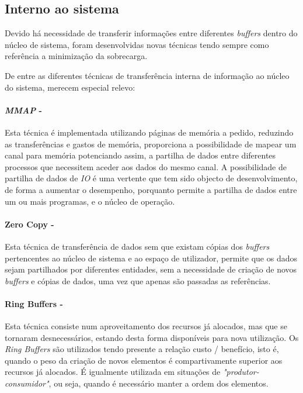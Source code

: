 \subsection{Interno ao sistema}

Devido há necessidade de transferir informações entre diferentes \textit{buffers} dentro do núcleo de sistema, foram desenvolvidas novas técnicas tendo sempre como referência a minimização da sobrecarga.

De entre as diferentes técnicas de transferência interna de informação ao núcleo do sistema, merecem especial relevo:

\paragraph*{\textit{MMAP} - }

Esta técnica é implementada utilizando páginas de memória a pedido, reduzindo as transferências e gastos de memória, proporciona a possibilidade de mapear um canal para memória potenciando assim, a partilha de dados entre diferentes processos que necessitem aceder aos dados do mesmo canal.
A possibilidade de partilha de dados de \textit{IO} é uma vertente que tem sido objecto de desenvolvimento, de forma a aumentar o desempenho, porquanto permite a partilha de dados entre um ou mais programas, e o núcleo de operação.

\paragraph*{Zero Copy - }

Esta técnica de transferência de dados sem que existam cópias dos \textit{buffers} pertencentes ao núcleo de sistema e ao espaço de utilizador, permite que os dados sejam partilhados por diferentes entidades, sem a necessidade de criação de novos \textit{buffers} e cópias de dados, uma vez que apenas são passadas as referências.

\paragraph*{Ring Buffers - }

Esta técnica consiste num aproveitamento dos recursos já alocados, mas que se tornaram desnecessários, estando desta forma disponíveis para nova utilização.
Os \textit{Ring Buffers} são utilizados tendo presente a relação custo / benefício, isto é, quando o peso da criação de novos elementos é compartivamente superior aos recursos já alocados.
É igualmente utilizada em situações de \textit{"produtor-consumidor"}, ou seja, quando é necessário manter a ordem dos elementos.

